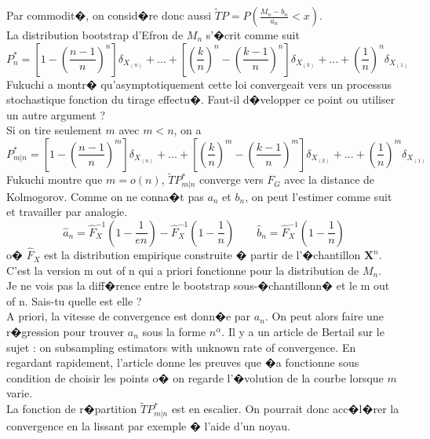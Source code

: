 \documentclass{article}
\begin{document}
\noindent Par commodit�, on consid�re donc aussi $\tilde{T}P = P\left(\frac{M_n - b_n}{a_n} < x\right)$.\\

\noindent La distribution bootstrap d'Efron de $M_n$ s'�crit comme suit
\begin{equation}
P^*_n = \left[1-\left(\frac{n-1}{n}\right)^n\right] \delta_{X_{(n)}} + ... +  \left[\left(\frac{k}{n}\right)^n-\left(\frac{k-1}{n}\right)^n\right] \delta_{X_{(k)}} + ... + \left(\frac{1}{n}\right)^n  \delta_{X_{(1)}}
\end{equation}
Fukuchi a montr� qu'asymptotiquement cette loi convergeait vers un processus stochastique fonction du tirage effectu�. Faut-il d�velopper ce point ou utiliser un autre argument ?\\

\noindent Si on tire seulement $m$ avec $m < n$, on a
\begin{equation}
P^*_{m|n} = \left[1-\left(\frac{n-1}{n}\right)^m\right] \delta_{X_{(n)}} + ... +  \left[\left(\frac{k}{n}\right)^m-\left(\frac{k-1}{n}\right)^m\right] \delta_{X_{(k)}} + ... + \left(\frac{1}{n}\right)^m  \delta_{X_{(1)}}
\end{equation}
Fukuchi montre que $m = o(n)$, $\tilde{T}P^*_{m|n}$ converge vers $F_G$ avec la distance  de Kolmogorov. Comme on ne conna�t pas $a_n$ et $b_n$, on peut l'estimer comme suit et travailler par analogie.
\begin{equation}
\hat{a}_n = \hat{F}_X^{-1}\left(1-\frac{1}{e n}\right) - \hat{F}_X^{-1}\left(1- \frac{1}{n}\right) \qquad \hat{b}_n = \hat{F}_X^{-1}\left(1- \frac{1}{n}\right)
\end{equation}
o� $\hat{F}_X$ est la distribution empirique construite � partir de l'�chantillon $\boldsymbol{X}^n$. C'est la version m out of n qui a priori fonctionne pour la distribution de $M_n$. \\

\noindent Je ne vois pas la diff�rence entre le bootstrap sous-�chantillonn� et le m out of n. Sais-tu quelle est elle ?\\

\noindent A priori, la vitesse de convergence est donn�e par $a_n$. On peut alors faire une r�gression pour trouver $a_n$ sous la forme $n^\alpha$. Il y a un article de Bertail sur le sujet : on subsampling estimators with unknown rate of convergence. En regardant rapidement, l'article donne les preuves que �a fonctionne sous condition de choisir les points o� on regarde l'�volution de la courbe lorsque $m$ varie.\\

\noindent La fonction de r�partition $\tilde{T}P^*_{m|n}$ est en escalier. On pourrait donc acc�l�rer la convergence en la lissant par exemple � l'aide d'un noyau.
\end{document}
